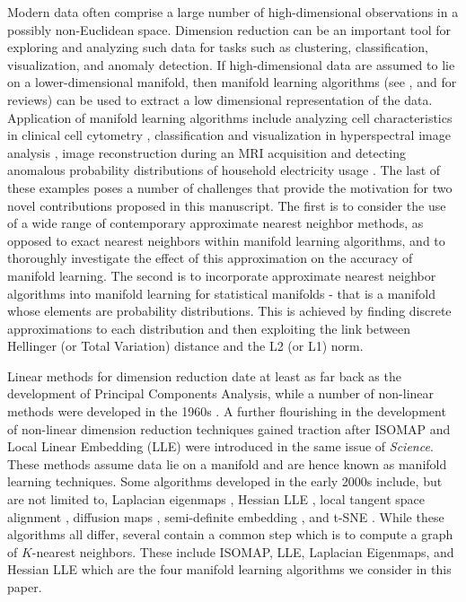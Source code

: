 \documentclass[11pt,a4paper,]{article}
\begin{document}
Modern data often comprise a large number of high-dimensional observations in a possibly non-Euclidean space. Dimension reduction can be an important tool for exploring and analyzing such data for tasks such as clustering, classification, visualization, and anomaly detection. If high-dimensional data are assumed to lie on a lower-dimensional manifold, then
manifold learning algorithms (see \textcite{Cayton2005-dp}, \textcite{Lee2007-wq} and \textcite{Izenman2012-mx} for reviews) can be used to extract a low dimensional representation of the data. Application of manifold learning algorithms include analyzing cell characteristics in clinical cell cytometry \autocite{Carter2009-ti}, classification and visualization in hyperspectral image analysis \autocite{Lunga2014-kc}, image reconstruction during an MRI acquisition \autocite{Zhu2018-jw} and detecting anomalous probability distributions of household electricity usage \autocite{Hyndman2018-nq}. The last of these examples poses a number of challenges that provide the motivation for two novel contributions proposed in this manuscript. The first is to consider the use of a wide range of contemporary approximate nearest neighbor methods, as opposed to exact nearest neighbors within manifold learning algorithms, and to thoroughly investigate the effect of this approximation on the accuracy of manifold learning. The second is to incorporate approximate nearest neighbor algorithms into manifold learning for statistical manifolds - that is a manifold whose elements are probability distributions. This is achieved by finding discrete approximations to each distribution and then exploiting the link between Hellinger (or Total Variation) distance and the L2 (or L1) norm.

Linear methods for dimension reduction date at least as far back as the development of Principal Components Analysis, while a number of non-linear methods were developed in the 1960s \autocite{Shepard1962a,Shepard1962b,Kruskal1964a,Kruskal1964b}. A further flourishing in the development of non-linear dimension reduction techniques gained traction after ISOMAP \autocite{Tenenbaum2000-fr} and Local Linear Embedding (LLE) \autocite{Roweis2000-ni} were introduced in the same issue of \emph{Science}. These methods assume data lie on a manifold and are hence known as manifold learning techniques. Some algorithms developed in the early 2000s include, but are not limited to, Laplacian eigenmaps \autocite{Belkin2003}, Hessian LLE \autocite{Donoho2003-am}, local tangent space alignment \autocite{Zhang2003-yi}, diffusion maps \autocite{Nadler2006-cm,Coifman2006-no}, semi-definite embedding \autocite{Weinberger2006-dc}, and t-SNE \autocite{Maaten2008-dw}. While these algorithms all differ, several contain a common step which is to compute a graph of \(K\)-nearest neighbors. These include ISOMAP, LLE, Laplacian Eigenmaps, and Hessian LLE which are the four manifold learning algorithms we consider in this paper.
\end{document}

